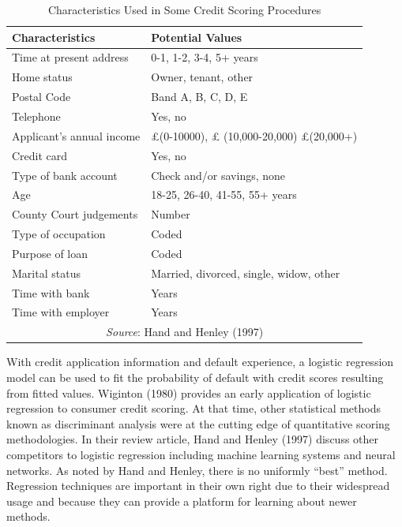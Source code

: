\begin{table}[h]
\caption{\label{T11:CreditCharacteristics} Characteristics Used in
Some Credit Scoring Procedures}
\begin{tabular}{ll}
   \hline
Characteristics & Potential Values \\
\hline Time at present address & 0-1, 1-2, 3-4, 5+ years \\
Home status & Owner, tenant, other \\
Postal Code & Band A, B, C, D, E \\
Telephone & Yes, no \\
Applicant's annual income & \pounds (0-10000), \pounds
(10,000-20,000)
\pounds(20,000+) \\
Credit card & Yes, no \\
Type of bank account & Check and/or savings, none \\
Age & 18-25, 26-40, 41-55, 55+ years \\
County Court judgements & Number \\
Type of occupation & Coded \\
Purpose of loan & Coded \\
Marital status & Married, divorced, single, widow, other \\
Time with bank & Years \\
Time with employer & Years \\
 \hline
     \multicolumn{2}{c}{\textit{Source}: Hand and Henley (1997)} \\
\end{tabular}
\end{table}

\bigskip

With credit application information and default experience, a
logistic regression model can be used to fit the probability of
default with credit scores resulting from fitted values. Wiginton
(1980) provides an early application of logistic regression to
consumer credit scoring. At that time, other statistical methods
known as discriminant analysis were at the cutting edge of
quantitative scoring methodologies. In their review article, Hand
and Henley (1997) discuss other competitors to logistic regression
including machine learning systems and neural networks. As noted by
Hand and Henley, there is no uniformly ``best'' method. Regression
techniques are important in their own right due to their widespread
usage and because they can provide a platform for learning about
newer methods.

